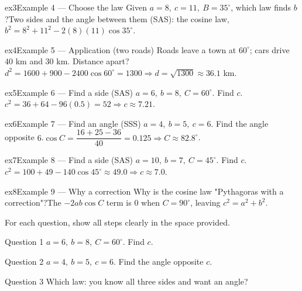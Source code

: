 \documentclass[11pt]{article}
\begin{document}
\begin{example}{ex3}{Example 4 --- Choose the law}
Given $a=8,\ c=11,\ B=35^\circ$, which law finds $b$?\soln Two sides and the angle between them (SAS): the cosine law, $b^2=8^2+11^2-2(8)(11)\cos35^\circ$.
\end{example}

\begin{example}{ex4}{Example 5 --- Application (two roads)}
Roads leave a town at $60^\circ$; cars drive $40$ km and $30$ km. Distance apart?\soln $d^2=1600+900-2400\cos60^\circ=1300\Rightarrow d=\sqrt{1300}\approx36.1$ km.
\end{example}

\begin{example}{ex5}{Example 6 --- Find a side (SAS)}
$a=6,\ b=8,\ C=60^\circ$. Find $c$.\soln $c^2=36+64-96(0.5)=52\Rightarrow c\approx7.21$.
\end{example}

\begin{example}{ex6}{Example 7 --- Find an angle (SSS)}
$a=4,\ b=5,\ c=6$. Find the angle opposite $6$.\soln $\cos C=\dfrac{16+25-36}{40}=0.125\Rightarrow C\approx82.8^\circ$.
\end{example}

\begin{example}{ex7}{Example 8 --- Find a side (SAS)}
$a=10,\ b=7,\ C=45^\circ$. Find $c$.\soln $c^2=100+49-140\cos45^\circ\approx49.0\Rightarrow c\approx7.0$.
\end{example}

\begin{example}{ex8}{Example 9 --- Why a correction}
Why is the cosine law "Pythagoras with a correction"?\soln The $-2ab\cos C$ term is $0$ when $C=90^\circ$, leaving $c^2=a^2+b^2$.
\end{example}

\clearpage
{}
For each question, show all steps clearly in the space provided.

\begin{qbox}{Question 1}
$a=6,\ b=8,\ C=60^\circ$. Find $c$.\workspace{2.4cm}
\end{qbox}

\begin{qbox}{Question 2}
$a=4,\ b=5,\ c=6$. Find the angle opposite $c$.\workspace{2.4cm}
\end{qbox}

\begin{qbox}{Question 3}
Which law: you know all three sides and want an angle?\workspace{2.4cm}
\end{qbox}
\end{document}
